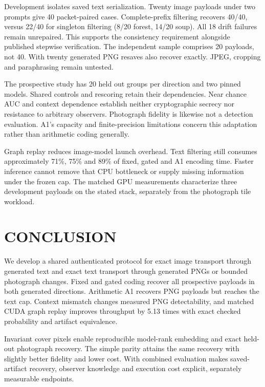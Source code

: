 \documentclass[a4paper,twoside]{article}
\begin{document}
Development isolates saved text serialization. Twenty image payloads under two prompts give 40 packet-paired cases. Complete-prefix filtering recovers 40/40, versus 22/40 for singleton filtering (8/20 forest, 14/20 soup). All 18 drift failures remain unrepaired. This supports the consistency requirement alongside published stepwise verification. The independent sample comprises 20 payloads, not 40. With twenty generated PNG resaves also recover exactly. JPEG, cropping and paraphrasing remain untested.

The prospective study has 20 held out groups per direction and two pinned models. Shared controls and rescoring retain their dependencies. Near chance AUC and context dependence establish neither cryptographic secrecy nor resistance to arbitrary observers. Photograph fidelity is likewise not a detection evaluation. A1's capacity and finite-precision limitations concern this adaptation rather than arithmetic coding generally.

Graph replay reduces image-model launch overhead. Text filtering still consumes approximately 71\%, 75\% and 89\% of fixed, gated and A1 encoding time. Faster inference cannot remove that CPU bottleneck or supply missing information under the frozen cap. The matched GPU measurements characterize three development payloads on the stated stack, separately from the photograph tile workload.

\space

\section{\uppercase{Conclusion}}
We develop a shared authenticated protocol for exact image transport through generated text and exact text transport through generated PNGs or bounded photograph changes. Fixed and gated coding recover all prospective payloads in both generated directions. Arithmetic A1 recovers PNG payloads but reaches the text cap. Context mismatch changes measured PNG detectability, and matched CUDA graph replay improves throughput by 5.13 times with exact checked probability and artifact equivalence.

Invariant cover pixels enable reproducible model-rank embedding and exact held-out photograph recovery. The simple parity attains the same recovery with slightly better fidelity and lower cost. With combined evaluation makes saved-artifact recovery, observer knowledge and execution cost explicit, separately measurable endpoints.

\space
\end{document}
